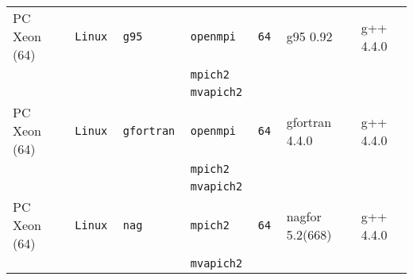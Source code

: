\begin{tabular}{lllllll}
PC Xeon (64)          &\tt Linux  &\tt g95          &\tt openmpi    &\tt 64              & g95 \footnotesize 0.92             & g++  \footnotesize 4.4.0        \\ %
                      &           &                 &\tt mpich2     &                    &                                    &                                 \\
                      &           &                 &\tt mvapich2   &                    &                                    &                                 \\
PC Xeon (64)          &\tt Linux  &\tt gfortran     &\tt openmpi    &\tt 64              & gfortran \footnotesize 4.4.0       & g++  \footnotesize 4.4.0        \\ %
                      &           &                 &\tt mpich2     &                    &                                    &                                 \\
                      &           &                 &\tt mvapich2   &                    &                                    &                                 \\
PC Xeon (64)          &\tt Linux  &\tt nag          &\tt mpich2     &\tt 64              & nagfor \footnotesize 5.2(668)      & g++  \footnotesize 4.4.0        \\ %
                      &           &                 &\tt mvapich2   &                    &                                    &                                 \\

\end{tabular}

